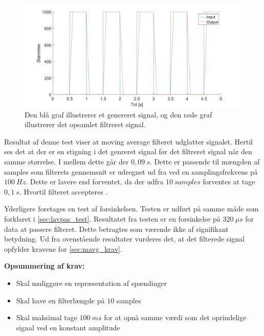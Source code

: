 \begin{figure}[H]
	\centering
	\includegraphics[width=1\textwidth]{figures/forsinkelse}
	\caption{Den blå graf illustrerer et genereret signal, og den røde graf illustrerer det opsamlet filtreret signal.}
	\label{fig:forsinkelse}
\end{figure}

\noindent
Resultat af denne test viser at moving average filteret udglatter signalet. Hertil ses det at der er en stigning i det genreret signal før det filtreret signal når den samme størrelse. I mellem dette går der $0,09~s$. Dette er passende til mængden af samples som filterets gennemsnit er udregnet ud fra ved en samplingsfrekvens på $100~Hz$. 
Dette er lavere end forventet, da der udfra $10~samples$ forventes at tage $0,1~s$. Hvortil filteret accepteres .  

Yderligere foretages en test af forsinkelsen. Testen er udført på samme måde som forklaret i \autoref{sec:lavpas_test}. Resultatet fra testen er en forsinkelse på $320~\mu s$ for data at passere filteret. Dette betragtes som værende ikke af signifikant betydning.    
Ud fra ovenstående resultater vurderes det, at det filterede signal opfylder kravene for \autoref{sec:mavg_krav}. 


\vspace{3mm}
\textbf{Opsummering af krav:}
\begin{itemize}
\item[\text{\sffamily \checkmark}] Skal muliggøre en repræsentation af spændinger 
\item[\text{\sffamily \checkmark}] Skal have en filterlængde på $10$ samples
\item[\text{\sffamily \checkmark}] Skal maksimal tage $100~ms$ for at opnå samme værdi som det oprindelige signal ved en konstant amplitude
\end{itemize}